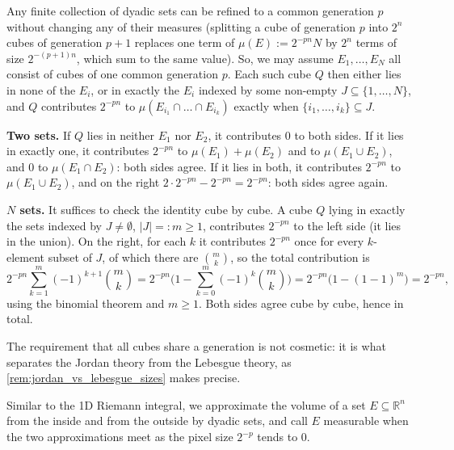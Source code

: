 \begin{exercisesolution}
Any finite collection of dyadic sets can be refined to a common generation $p$ without changing
any of their measures (splitting a cube of generation $p$ into $2^n$ cubes of generation $p+1$
replaces one term of $\mu(E) := 2^{-pn}N$ by $2^n$ terms of size $2^{-(p+1)n}$, which sum to the
same value). So, we may assume $E_1,\dots,E_N$ all consist of cubes of one common generation
$p$. Each such cube $Q$ then either lies in none of the $E_i$, or in exactly the $E_i$ indexed
by some non-empty $J \subseteq \{1,\dots,N\}$, and $Q$ contributes $2^{-pn}$ to
$\mu(E_{i_1}\cap\dots\cap E_{i_k})$ exactly when $\{i_1,\dots,i_k\}\subseteq J$.

\textbf{Two sets.} If $Q$ lies in neither $E_1$ nor $E_2$, it contributes $0$ to both sides. If
it lies in exactly one, it contributes $2^{-pn}$ to $\mu(E_1)+\mu(E_2)$ and to
$\mu(E_1\cup E_2)$, and $0$ to $\mu(E_1\cap E_2)$: both sides agree. If it lies in both, it
contributes $2^{-pn}$ to $\mu(E_1\cup E_2)$, and on the right
$2\cdot2^{-pn}-2^{-pn}=2^{-pn}$: both sides agree again.

\textbf{$N$ sets.} It suffices to check the identity cube by cube. A cube $Q$ lying in exactly
the sets indexed by $J\neq\emptyset$, $|J|=:m\geq1$, contributes $2^{-pn}$ to the left side (it
lies in the union). On the right, for each $k$ it contributes $2^{-pn}$ once for every
$k$-element subset of $J$, of which there are $\binom{m}{k}$, so the total contribution is
\[2^{-pn}\sum_{k=1}^m(-1)^{k+1}\binom{m}{k} = 2^{-pn}\Big(1-\sum_{k=0}^m(-1)^k\binom{m}{k}\Big)
  = 2^{-pn}\big(1-(1-1)^m\big) = 2^{-pn},\]
using the binomial theorem and $m\geq1$. Both sides agree cube by cube, hence in total.
\end{exercisesolution}

The requirement that all cubes share a generation is not cosmetic: it is what separates the
Jordan theory from the Lebesgue theory, as \cref{rem:jordan_vs_lebesgue_sizes} makes precise.

Similar to the 1D Riemann integral, we approximate the volume of a set $E \subseteq \mathbb{R}^n$
from the inside and from the outside by dyadic sets, and call $E$ measurable when the two
approximations meet as the pixel size $2^{-p}$ tends to $0$.

